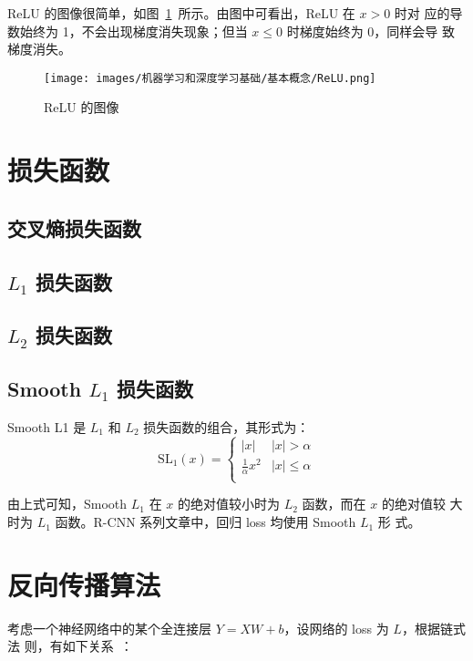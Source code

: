ReLU 的图像很简单，如图~\ref{fig:ReLU}~所示。由图中可看出，ReLU 在 $x > 0$ 时对
应的导数始终为 1，不会出现梯度消失现象；但当 $x \leq 0$ 时梯度始终为 0，同样会导
致梯度消失。

\begin{figure}[ht]
  \centering
  \texttt{[image: images/机器学习和深度学习基础/基本概念/ReLU.png]}
  \caption{ReLU 的图像}
  \label{fig:ReLU}
\end{figure}

\section{损失函数}

\subsection{交叉熵损失函数}

\subsection{$L_1$ 损失函数}

\subsection{$L_2$ 损失函数}

\subsection{Smooth $L_1$ 损失函数}
Smooth L1 是 $L_1$ 和 $L_2$ 损失函数的组合，其形式为：
\begin{equation}
  \label{equ:SmoothL1}
  \mathrm{SL}_1(x) = \left\{
    \begin{array}{lr}
      |x| & |x| > \alpha \\
      \frac{1}{\alpha} x^2 & |x| \leq \alpha \\
    \end{array}
  \right.
\end{equation}

由上式可知，Smooth $L_1$ 在 $x$ 的绝对值较小时为 $L_2$ 函数，而在 $x$ 的绝对值较
大时为 $L_1$ 函数。R-CNN 系列文章中，回归 loss 均使用 Smooth $L_1$ 形
式。

\section{反向传播算法}
考虑一个神经网络中的某个全连接层 $Y = XW + b$，设网络的 loss 为 $L$，根据链式法
则，有如下关系~：

